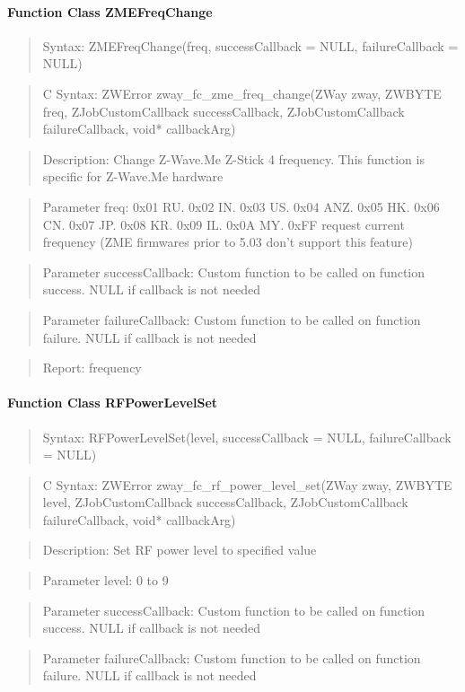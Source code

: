 \paragraph{Function Class ZMEFreqChange}
\begin{quote}Syntax: ZMEFreqChange(freq, successCallback = NULL, failureCallback = NULL)\end{quote}
\begin{quote}C Syntax: ZWError zway\_fc\_zme\_freq\_change(ZWay zway, ZWBYTE freq, ZJobCustomCallback successCallback, ZJobCustomCallback failureCallback, void* callbackArg)\end{quote}
\begin{quote}Description: Change Z-Wave.Me Z-Stick 4 frequency. This function is specific for Z-Wave.Me hardware\end{quote}
\begin{quote}Parameter freq: 0x01 RU. 0x02 IN. 0x03 US. 0x04 ANZ. 0x05 HK. 0x06 CN. 0x07 JP. 0x08 KR. 0x09 IL. 0x0A MY. 0xFF request current frequency (ZME firmwares prior to 5.03 don't support this feature)\end{quote}
\begin{quote}Parameter successCallback: Custom function to be called on function success. NULL if callback is not needed\end{quote}
\begin{quote}Parameter failureCallback: Custom function to be called on function failure. NULL if callback is not needed\end{quote}
\begin{quote}Report: frequency\end{quote}

\paragraph{Function Class RFPowerLevelSet}
\begin{quote}Syntax: RFPowerLevelSet(level, successCallback = NULL, failureCallback = NULL)\end{quote}
\begin{quote}C Syntax: ZWError zway\_fc\_rf\_power\_level\_set(ZWay zway, ZWBYTE level, ZJobCustomCallback successCallback, ZJobCustomCallback failureCallback, void* callbackArg)\end{quote}
\begin{quote}Description: Set RF power level to specified value\end{quote}
\begin{quote}Parameter level: 0 to 9\end{quote}
\begin{quote}Parameter successCallback: Custom function to be called on function success. NULL if callback is not needed\end{quote}
\begin{quote}Parameter failureCallback: Custom function to be called on function failure. NULL if callback is not needed\end{quote}


